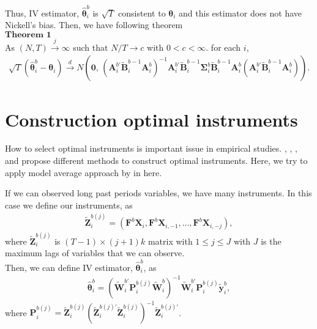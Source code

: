 \documentclass[12pt,a4paper,hyperref]{article}
\begin{document}
Thus, IV  estimator, $\hat{\boldsymbol{\theta}}^{b}_{ i}$ is $\sqrt{T}$ consistent to $\boldsymbol{\theta}_{i}$ and this estimator does not have Nickell's bias. Then, we have following theorem\\
$\mathbf{Theorem \,\,1}$ \\
As $\left(N,T \right)\overset{j}{\to} \infty $ such that $N/T \to c$ with $0< c< \infty$. for each $i$,
\begin{align}
\sqrt{T}\left(\hat{\boldsymbol{\theta}}^{b}_{i}-\boldsymbol{\theta}_{i}  \right)\overset{d}{\to} N \left(\boldsymbol{0},\,\left(\boldsymbol{A}_{i}^{b'}\tilde{\boldsymbol{B}}_{i}^{b -1}\boldsymbol{A}^{b}_{i} \right)^{-1}\boldsymbol{A}_{i}^{b'}\tilde{\boldsymbol{B}}_{i}^{b -1}   \boldsymbol{\Sigma}^{b}_{i}\tilde{\boldsymbol{B}}_{i}^{b -1} \boldsymbol{A}^{b}_{i}\left(\boldsymbol{A}_{i}^{b'}\tilde{\boldsymbol{B}}_{i}^{b -1}\boldsymbol{A}^{b}_{i} \right)\right).
\end{align}


\section{Construction optimal instruments}
How to select optimal instruments is important issue in empirical studies.
\citet{Stephen:2001}, \citet{Kuersteiner:2010}, \citet{Ryo:2011}, \citet{Kang:2019} and \citet{Seojeong:2019} propose different methods to construct optimal instruments.
Here, we try to apply model average approach by \citet{Kuersteiner:2010} in here.


If we can observed long past periods variables, we have many instruments. In this case we define our instruments, as
\begin{align}
\tilde{\boldsymbol{Z}}^{b(j)}_{i}=\left( \boldsymbol{F}^{b}\boldsymbol{X}_{i}, \boldsymbol{F}^{b} \boldsymbol{X}_{i,-1},\ldots, \boldsymbol{F}^{b} \boldsymbol{X}_{i,-j}  \right),
\end{align}
where $\tilde{\boldsymbol{Z}}^{b(j)}_{i}$ is $(T-1) \times  (j+1)k$ matrix with $1\leq j \leq J $ with $J$ is the maximum lags of variables that we can observe. \\




Then, we can define IV estimator, $\hat{\boldsymbol{\theta}}^{b}_{i}$, as
\begin{align}
\hat{\boldsymbol{\theta}}^{b}_{i}= \left( \tilde{\boldsymbol{W}}^{b'}_{i}\boldsymbol{P}^{b(j)}_{i} \tilde{\boldsymbol{W}}^{b}_{i} \right)^{-1} \tilde{\boldsymbol{W}}^{b'}_{i}\boldsymbol{P}^{b(j)}_{i} \tilde{\boldsymbol{y}}^{b}_{i},
\end{align}
where $\boldsymbol{P}^{b(j)}_{i}=\tilde{\boldsymbol{Z}}^{b(j)}_{i} \left(\tilde{\boldsymbol{Z}}^{b(j)'}_{i}\tilde{\boldsymbol{Z}}^{b(j)}_{i} \right)^{-1}\tilde{\boldsymbol{Z}}^{b(j)'}_{i}$.
\end{document}
